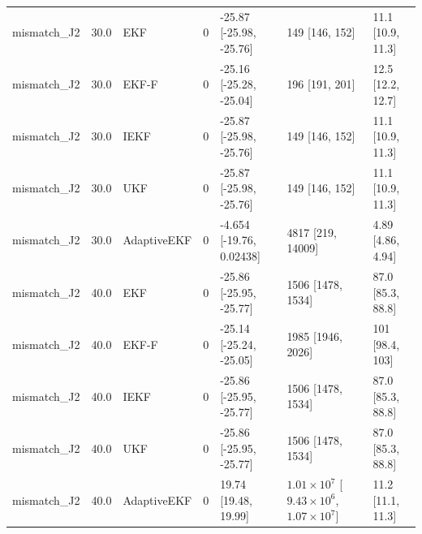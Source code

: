 {\begin{longtable}{lllllll}
mismatch\_J2 & 30.0 & EKF & 0 & -25.87 [-25.98, -25.76] & 149 [146, 152] & 11.1 [10.9, 11.3] \\
mismatch\_J2 & 30.0 & EKF-F & 0 & -25.16 [-25.28, -25.04] & 196 [191, 201] & 12.5 [12.2, 12.7] \\
mismatch\_J2 & 30.0 & IEKF & 0 & -25.87 [-25.98, -25.76] & 149 [146, 152] & 11.1 [10.9, 11.3] \\
mismatch\_J2 & 30.0 & UKF & 0 & -25.87 [-25.98, -25.76] & 149 [146, 152] & 11.1 [10.9, 11.3] \\
mismatch\_J2 & 30.0 & AdaptiveEKF & 0 & -4.654 [-19.76, 0.02438] & 4817 [219, 14009] & 4.89 [4.86, 4.94] \\
mismatch\_J2 & 40.0 & EKF & 0 & -25.86 [-25.95, -25.77] & 1506 [1478, 1534] & 87.0 [85.3, 88.8] \\
mismatch\_J2 & 40.0 & EKF-F & 0 & -25.14 [-25.24, -25.05] & 1985 [1946, 2026] & 101 [98.4, 103] \\
mismatch\_J2 & 40.0 & IEKF & 0 & -25.86 [-25.95, -25.77] & 1506 [1478, 1534] & 87.0 [85.3, 88.8] \\
mismatch\_J2 & 40.0 & UKF & 0 & -25.86 [-25.95, -25.77] & 1506 [1478, 1534] & 87.0 [85.3, 88.8] \\
mismatch\_J2 & 40.0 & AdaptiveEKF & 0 & 19.74 [19.48, 19.99] & $1.01\times10^{7}$ [$9.43\times10^{6}$, $1.07\times10^{7}$] & 11.2 [11.1, 11.3] \\
\bottomrule
\end{longtable}
}
